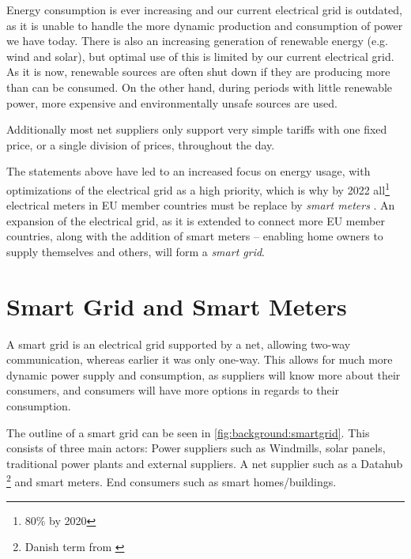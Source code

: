 
Energy consumption is ever increasing and our current electrical grid is outdated, as it is unable to handle the more dynamic production and consumption of power we have today.
There is also an increasing generation of renewable energy (e.g. wind and solar), but optimal use of this is limited by our current electrical grid.
As it is now, renewable sources are often shut down if they are producing more than can be consumed.
On the other hand, during periods with little renewable power, more expensive and environmentally unsafe sources are used.

Additionally most net suppliers only support very simple tariffs with one fixed price, or a single division of prices, throughout the day.

The statements above have led to an increased focus on energy usage, with optimizations of the electrical grid as a high priority, which is why by 2022 all\footnote{80\% by 2020} electrical meters in EU member countries must be replace by \textit{smart meters} \cite{smart_meter_survey, directive_2009_72_EC}.
An expansion of the electrical grid, as it is extended to connect more EU member countries, along with the addition of smart meters -- enabling home owners to supply themselves and others, will form a \textit{smart grid}.

\section{Smart Grid and Smart Meters}
A smart grid is an electrical grid supported by a net, allowing two-way communication, whereas earlier it was only one-way.
This allows for much more dynamic power supply and consumption, as suppliers will know more about their consumers, and consumers will have more options in regards to their consumption.

The outline of a smart grid can be seen in \cref{fig:background:smartgrid}.
This consists of three main actors:
Power suppliers such as Windmills, solar panels, traditional power plants and external suppliers.
A net supplier such as a Datahub \footnote{Danish term from \cite{LOV_nr_575_af_18-06-2012}} and smart meters.
End consumers such as smart homes/buildings.

